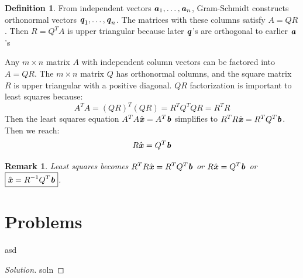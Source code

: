 \documentclass[12pt, letterpaper]{article}
\newcommand{\V}[1]{\textbf{\textit{#1}}}
\newtheorem*{remark}{Remark}
\theoremstyle{definition}
\newtheorem{definition}{Definition}[section]
\newenvironment{problem}[2][Problem]{\begin{trivlist}
		\item[\hskip \labelsep {\bfseries #1}\hskip \labelsep {\bfseries #2.}]}{\end{trivlist}}
\begin{document}
		\begin{definition}
			From independent vectors $\V{a}_1, \ldots, \V{a}_n$, Gram-Schmidt constructs orthonormal vectors $\V{q}_1, \ldots, \V{q}_n$. The matrices with these columns satisfy $A = QR$. Then $R = Q^T A$ is upper triangular because later $\V{q}$'s are orthogonal to earlier $\V{a}$'s
		\end{definition}
	
		Any $m \times n$ matrix $A$ with independent column vectors can be factored into $A = QR$. The $m \times n$ matrix $Q$ has orthonormal columns, and the square matrix $R$ is upper triangular with a positive diagonal. $QR$ factorization is important to least squares because:
			\begin{equation}
				A^T A = (QR)^T (QR) = R^T Q^T Q R = R^T R
			\end{equation}
		Then the least squares equation $A^T A \hat{\V{x}} = A^T \V{b}$ simplifies to $R^T R \hat{\V{x}} = R^T Q^T \V{b}$. Then we reach:
				\begin{equation}
					R\hat{\V{x}} = Q^T \V{b}
				\end{equation}
				
		\begin{remark}
			Least squares becomes $R^T R \hat{\V{x}} = R^T Q^T \V{b}$ or $R\hat{\V{x}} = Q^T \V{b}$ or $\boxed{\hat{\V{x}} = R^{-1} Q^T \V{b}}$. 
		\end{remark}
\section{Problems}


	\begin{problem}{1.1}
		asd
	\end{problem}
	
	\begin{proof}[Solution]
		soln
	\end{proof}
	
	
	
	
	
	
	
\end{document}
